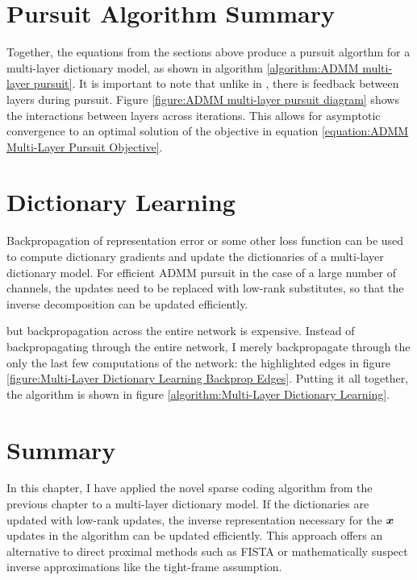 \section{Pursuit Algorithm Summary}
Together, the equations from the sections above produce a pursuit algorthm for a multi-layer dictionary model, as shown in algorithm \ref{algorithm:ADMM multi-layer pursuit}. It is important to note that unlike in \cite{zeiler2010deconvolutional}, there is feedback between layers during pursuit.  Figure \ref{figure:ADMM multi-layer pursuit diagram} shows the interactions between layers across iterations. This allows for asymptotic convergence to an optimal solution of the objective in equation \ref{equation:ADMM Multi-Layer Pursuit Objective}.

\section{Dictionary Learning}
Backpropagation of representation error or some other loss function can be used to compute dictionary gradients and update the dictionaries of a multi-layer dictionary model. For efficient ADMM pursuit in the case of a large number of channels, the updates need to be replaced with low-rank substitutes, so that the inverse decomposition can be updated efficiently.




but backpropagation across the entire network is expensive. Instead of backpropagating through the entire network, I merely backpropagate through the only the last few computations of the network: the highlighted edges in figure \ref{figure:Multi-Layer Dictionary Learning Backprop Edges}. Putting it all together, the algorithm is shown in figure \ref{algorithm:Multi-Layer Dictionary Learning}.

\section{Summary}
In this chapter, I have applied the novel sparse coding algorithm from the previous chapter to a multi-layer dictionary model. If the dictionaries are updated with low-rank updates, the inverse representation necessary for the $\bm{x}$ updates in the algorithm can be updated efficiently. This approach offers an alternative to direct proximal methods such as FISTA or mathematically suspect inverse approximations like the tight-frame assumption.
